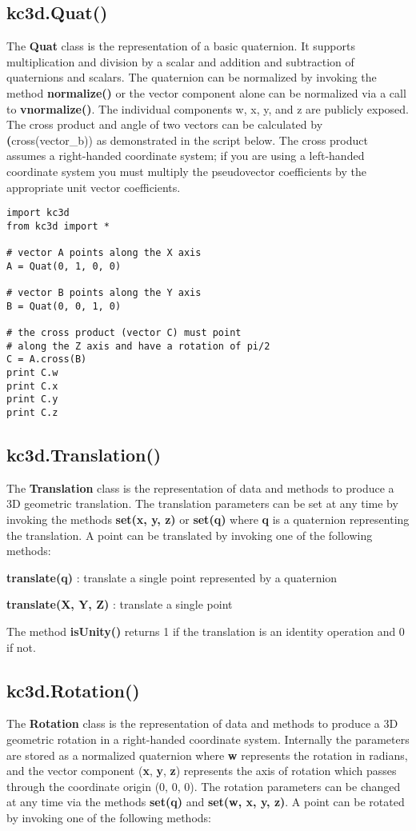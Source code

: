 \documentclass[a4paper, dvipdfm]{article}
\begin{document}
\subsection{kc3d.Quat()}
The \textbf{Quat} class is the representation of a basic quaternion. It supports
multiplication and division by a scalar and addition and subtraction of quaternions
and scalars. The quaternion can be normalized by invoking the method \textbf{normalize()}
or the vector component alone can be normalized via a call to \textbf{vnormalize()}.
The individual components w, x, y, and z are publicly exposed. The cross product
and angle of two vectors can be calculated by \textbf(cross(vector\_b)) as demonstrated
in the script below. The cross product assumes a right-handed coordinate system; if
you are using a left-handed coordinate system you must multiply the pseudovector
coefficients by the appropriate unit vector coefficients.

\begin{verbatim}
import kc3d
from kc3d import *

# vector A points along the X axis
A = Quat(0, 1, 0, 0)

# vector B points along the Y axis
B = Quat(0, 0, 1, 0)

# the cross product (vector C) must point
# along the Z axis and have a rotation of pi/2
C = A.cross(B)
print C.w
print C.x
print C.y
print C.z
\end{verbatim}

\subsection{kc3d.Translation()}
The \textbf{Translation} class is the representation of data and methods to
produce a 3D geometric translation. The translation parameters can be set at any
time by invoking the methods \textbf{set(x, y, z)} or \textbf{set(q)} where \textbf{q}
is a quaternion representing the translation. A point can be
translated by invoking one of the following methods:

\textbf{translate(q)} : translate a single point represented by a quaternion

\textbf{translate(X, Y, Z)} : translate a single point

The method \textbf{isUnity()} returns 1 if the translation is an identity operation and
0 if not.

\subsection{kc3d.Rotation()}
The \textbf{Rotation} class is the representation of data and methods to produce
a 3D geometric rotation in a right-handed coordinate system. Internally the
parameters are stored as a normalized quaternion where \textbf{w} represents the
rotation in radians, and the vector component (\textbf{x}, \textbf{y}, \textbf{z})
represents the axis of rotation which passes through the coordinate origin (0, 0, 0).
The rotation parameters can be changed at any time via the methods \textbf{set(q)}
and \textbf{set(w, x, y, z)}. A point can be rotated by invoking one
of the following methods:
\end{document}

